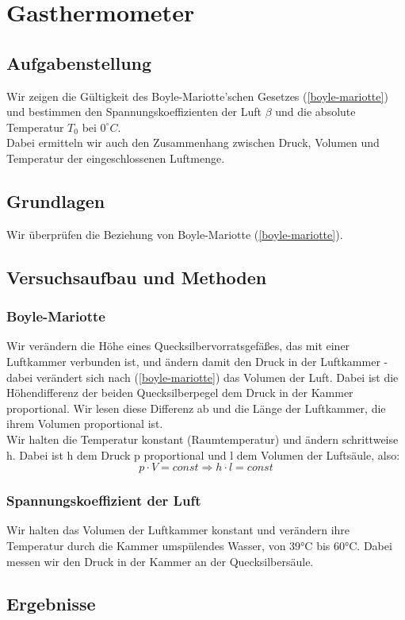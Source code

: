 \documentclass{article}
\begin{document}
\section{Gasthermometer}
\subsection{Aufgabenstellung}
Wir zeigen die Gültigkeit des Boyle-Mariotte'schen Gesetzes (\ref{boyle-mariotte}) und bestimmen den Spannungskoeffizienten der Luft $\beta$ und die absolute Temperatur $T_0$ bei $0^\circ C$.\\
Dabei ermitteln wir auch den Zusammenhang zwischen Druck, Volumen und Temperatur der eingeschlossenen Luftmenge.
\subsection{Grundlagen}
Wir überprüfen die Beziehung von Boyle-Mariotte (\ref{boyle-mariotte}).
\subsection{Versuchsaufbau und Methoden}
\subsubsection{Boyle-Mariotte}
Wir verändern die Höhe eines Quecksilbervorratsgefäßes, das mit einer Luftkammer verbunden ist, und ändern damit den Druck in der Luftkammer - dabei verändert sich nach (\ref{boyle-mariotte}) das Volumen der Luft. Dabei ist die Höhendifferenz der beiden Quecksilberpegel dem Druck in der Kammer proportional. Wir lesen diese Differenz ab und die Länge der Luftkammer, die ihrem Volumen proportional ist. \\
Wir halten die Temperatur konstant (Raumtemperatur) und ändern schrittweise h. Dabei ist h dem Druck p proportional und l dem Volumen der Luftsäule, also:
$$p\cdot V=const \Rightarrow h \cdot l=const$$

\subsubsection{Spannungskoeffizient der Luft}
Wir halten das Volumen der Luftkammer konstant und verändern ihre Temperatur durch die Kammer umspülendes Wasser, von 39°C bis 60°C. Dabei messen wir den Druck in der Kammer an der Quecksilbersäule. 
\subsection{Ergebnisse}
\end{document}
